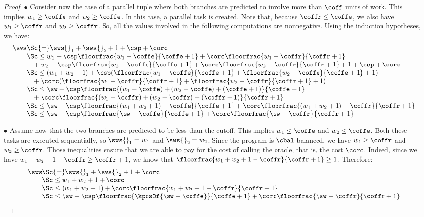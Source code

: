 \begin{proof}
$\bullet$  Consider now the case of a parallel tuple
where both branches are predicted to involve more than $\coff$ units of work.
This implies $w_1 \geq \coffe$ and $w_2 \geq \coffe$.
In this case, a parallel task is created. 
Note that, because $\coffr \leq \coffe$, we also have 
$w_1 \geq \coffr$ and $w_2 \geq \coffr$. So, all the values
involved in the following computations are nonnegative.
Using the induction hypotheses, we have:
%
$$\begin{array}{l@{}ll}
\sws 
& \Sc{=} \sws{}_1 + \sws{}_2 + 1 + \csp + \corc  \\ 
& \Sc\leq w_1 + \csp \floorfrac{w_1-\coffe}{\coffe+1} + \corc \floorfrac{w_1-\coffr}{\coffr+1} \\
& \quad +\; w_2 + \csp \floorfrac{w_2-\coffe}{\coffe+1} + \corc \floorfrac{w_2-\coffr}{\coffr+1} + 1 + \csp + \corc \\ 
& \Sc\leq (w_1 + w_2 + 1) + \csp (\floorfrac{w_1-\coffe}{\coffe+1} + \floorfrac{w_2-\coffe}{\coffe+1} + 1) \\
& \quad +\;\corc (\floorfrac{w_1-\coffr}{\coffr+1} + \floorfrac{w_2-\coffr}{\coffr+1} + 1)  \\
& \Sc\leq \sw + \csp \floorfrac{(w_1-\coffe)+(w_2-\coffe)+(\coffe+1)}{\coffe+1}  \\
& \quad +\; \corc \floorfrac{(w_1-\coffr)+(w_2-\coffr)+(\coffr+1)}{\coffr+1} \\
& \Sc\leq \sw + \csp \floorfrac{(w_1+w_2+1)-\coffe}{\coffe+1} + \corc \floorfrac{(w_1+w_2+1)-\coffr}{\coffr+1} \\
& \Sc\leq \sw + \csp \floorfrac{\sw-\coffe}{\coffe+1} + \corc \floorfrac{\sw-\coffr}{\coffr+1}  \\
\end{array}$$

$\bullet$  Assume now that the two branches are predicted to be less than the cutoff.
This implies $w_1 \leq \coffe$ and $w_2 \leq \coffe$. Both these tasks
are executed sequentially, so $\sws{}_1 = w_1$ and $\sws{}_2 = w_2$. %
Since the program is $\cbal$-balanced, 
%
%
we have $w_1 \geq \coffr$
and $w_2 \geq \coffr$. 
Those inequalities ensure that we are able to pay for the cost of calling the oracle,
that is, the cost $\corc$.
Indeed, since we have $w_1 + w_2 + 1 - \coffr \geq \coffr+1$, 
we know that $\floorfrac{w_1 + w_2 + 1-\coffr}{\coffr+1} \geq 1$.
Therefore:
%
$$\begin{array}{l@{}ll}
\sws 
& \Sc{=} \sws{}_1 + \sws{}_2 + 1 + \corc \\ 
& \Sc\leq w_1 + w_2 + 1 + \corc \\
& \Sc\leq (w_1 + w_2 + 1) + \corc \floorfrac{w_1 + w_2 + 1-\coffr}{\coffr+1}  \\
& \Sc\leq \sw + \csp \floorfrac{\kposOf{\sw-\coffe}}{\coffe+1} + \corc \floorfrac{\sw-\coffr}{\coffr+1} \\
\end{array}$$


\end{proof}
